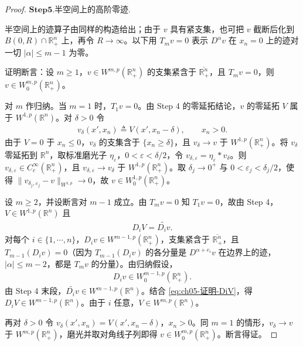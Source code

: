 \begin{proof}
\noindent$\mathbf{Step}\mathbf{5}.${\heiti 半空间上的高阶零迹.}

半空间上的迹算子由同样的构造给出；由于 $v$ 具有紧支集，也可把 $v$ 截断后化到 $B(0,R)\cap\mathbb{R}^{n}_{+}$ 上，再令 $R\to\infty$。以下用 $T_{m}v=0$ 表示 $D^{\alpha}v$ 在 $x_{n}=0$ 上的迹对一切 $|\alpha|\leqslant m-1$ 为零。

证明断言：设 $m\geqslant1$，$v\in W^{m,p}(\mathbb{R}^{n}_{+})$ 的支集紧含于 $\overline{\mathbb{R}^{n}_{+}}$，且 $T_{m}v=0$，则 $v\in W^{m,p}_{0}(\mathbb{R}^{n}_{+})$。

对 $m$ 作归纳。当 $m=1$ 时，$T_{1}v=0$。由 Step 4 的零延拓结论，$v$ 的零延拓 $V$ 属于 $W^{1,p}(\mathbb{R}^{n})$。对 $\delta>0$ 令
\begin{align*}
v_{\delta}(x',x_{n})\triangleq V(x',x_{n}-\delta),
\qquad x_{n}>0.
\end{align*}
由于 $V=0$ 于 $x_{n}\leqslant0$，$v_{\delta}$ 的支集含于 $\{x_{n}\geqslant\delta\}$，且 $v_{\delta}\to v$ 于 $W^{1,p}(\mathbb{R}^{n}_{+})$。将 $v_{\delta}$ 零延拓到 $\mathbb{R}^{n}$，取标准磨光子 $\eta_{\varepsilon}$，$0<\varepsilon<\delta/2$，令 $v_{\delta,\varepsilon}=\eta_{\varepsilon}*v_{\delta}$。则 $v_{\delta,\varepsilon}\in C^{\infty}_{c}(\mathbb{R}^{n}_{+})$，且 $v_{\delta,\varepsilon}\to v_{\delta}$ 于 $W^{1,p}(\mathbb{R}^{n}_{+})$。取 $\delta_{j}\to0^{+}$ 与 $0<\varepsilon_{j}<\delta_{j}/2$，使得 $\|v_{\delta_{j},\varepsilon_{j}}-v\|_{W^{1,p}}\to0$，故 $v\in W^{1,p}_{0}(\mathbb{R}^{n}_{+})$。

设 $m\geqslant2$，并设断言对 $m-1$ 成立。由 $T_{m}v=0$ 知 $T_{1}v=0$，故由 Step 4，$V\in W^{1,p}(\mathbb{R}^{n})$ 且
\begin{align}
D_{i}V=\widetilde{D_{i}v}.
\label{eq:ch05-证明-DiV}
\end{align}
对每个 $i\in\{1,\cdots,n\}$，$D_{i}v\in W^{m-1,p}(\mathbb{R}^{n}_{+})$，支集紧含于 $\overline{\mathbb{R}^{n}_{+}}$，且 $T_{m-1}(D_{i}v)=0$（因为 $T_{m-1}(D_{i}v)$ 的各分量是 $D^{\alpha+e_{i}}v$ 在边界上的迹，$|\alpha|\leqslant m-2$，都是 $T_{m}v$ 的分量）。由归纳假设，
\begin{align}
D_{i}v\in W^{m-1,p}_{0}(\mathbb{R}^{n}_{+}).
\label{eq:ch05-证明-Div零迹}
\end{align}
由 Step 4 末段，$\widetilde{D_{i}v}\in W^{m-1,p}(\mathbb{R}^{n})$。结合 \eqref{eq:ch05-证明-DiV}，得 $D_{i}V\in W^{m-1,p}(\mathbb{R}^{n})$。由于 $i$ 任意，$V\in W^{m,p}(\mathbb{R}^{n})$。

再对 $\delta>0$ 令 $v_{\delta}(x',x_{n})=V(x',x_{n}-\delta)$，$x_{n}>0$。同 $m=1$ 的情形，$v_{\delta}\to v$ 于 $W^{m,p}(\mathbb{R}^{n}_{+})$，磨光并取对角线子列即得 $v\in W^{m,p}_{0}(\mathbb{R}^{n}_{+})$。断言得证。


\end{proof}
